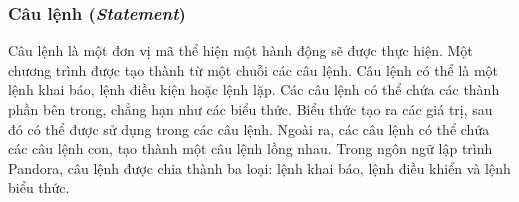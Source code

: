 \subsubsection{Câu lệnh (\textit{Statement})}

\regexstmt

Câu lệnh là một đơn vị mã thể hiện một hành động sẽ được thực hiện. Một chương trình được tạo thành từ một chuỗi các câu lệnh. Câu lệnh có thể là một lệnh khai báo, lệnh điều kiện hoặc lệnh lặp. Các câu lệnh có thể chứa các thành phần bên trong, chẳng hạn như các biểu thức. Biểu thức tạo ra các giá trị, sau đó có thể được sử dụng trong các câu lệnh. Ngoài ra, các câu lệnh có thể chứa các câu lệnh con, tạo thành một câu lệnh lồng nhau. Trong ngôn ngữ lập trình Pandora, câu lệnh được chia thành ba loại: lệnh khai báo, lệnh điều khiển và lệnh biểu thức.




